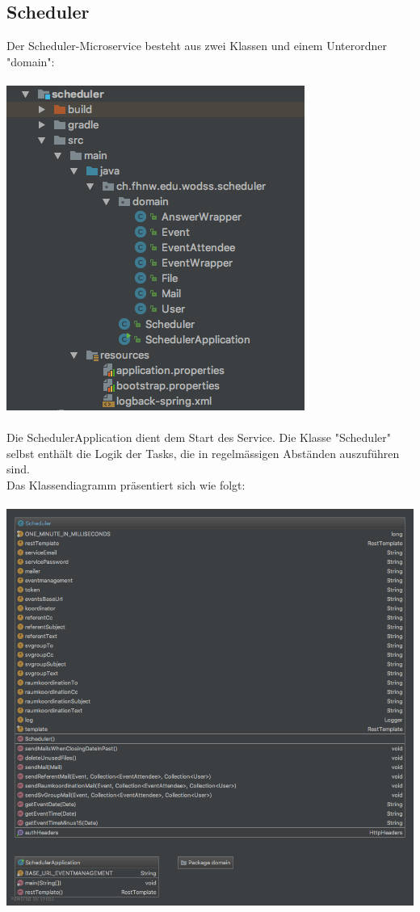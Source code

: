 \documentclass[11pt]{article} %
\begin{document}
\subsection{Scheduler}
Der Scheduler-Microservice besteht aus zwei Klassen und einem Unterordner "domain":
\\
\\
\includegraphics[scale=0.7]{structure_scheduler}
\\
\\
Die SchedulerApplication dient dem Start des Service. Die Klasse "Scheduler" selbst enthält die Logik der Tasks, die in regelmässigen Abständen auszuführen sind.
\\
Das Klassendiagramm präsentiert sich wie folgt:
\\
\\
\includegraphics[width=1.0\textwidth]{class-diagrams/Scheduler-00}
\end{document}
